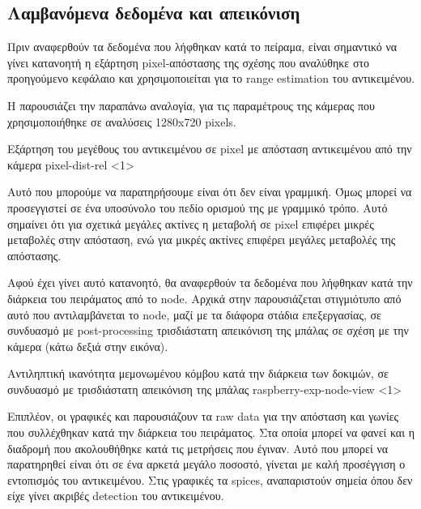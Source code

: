 \subsection{Λαμβανόμενα δεδομένα και απεικόνιση} \label{sec:expe-single-3d}

Πριν αναφερθούν τα δεδομένα που λήφθηκαν κατά το πείραμα, είναι σημαντικό να γίνει κατανοητή η εξάρτηση pixel-απόστασης της σχέσης  που αναλύθηκε στο προηγούμενο κεφάλαιο και χρησιμοποιείται για το range estimation του αντικειμένου.

Η  παρουσιάζει την παραπάνω αναλογία, για τις παραμέτρους της κάμερας που χρησιμοποιήθηκε σε αναλύσεις 1280x720 pixels.

{Εξάρτηση του μεγέθους του αντικειμένου σε pixel με απόσταση αντικειμένου από την κάμερα}%
{pixel-dist-rel}%
<1>

Αυτό που μπορούμε να παρατηρήσουμε είναι ότι δεν είναι γραμμική. Όμως μπορεί να προσεγγιστεί σε ένα υποσύνολο του πεδίο ορισμού της με γραμμικό τρόπο. Αυτό σημαίνει ότι για σχετικά μεγάλες ακτίνες η μεταβολή σε pixel επιφέρει μικρές με\-τα\-βο\-λές στην απόσταση, ενώ για μικρές ακτίνες επιφέρει μεγάλες μεταβολές της απόστασης. 

Αφού έχει γίνει αυτό κατανοητό, θα αναφερθούν τα δεδομένα που λήφθηκαν κατά την διάρκεια του πειράματος από το node.
Αρχικά στην  παρουσιάζεται στιγμιότυπο από αυτό που αντιλαμβάνεται 
το node, μαζί με τα διάφορα στάδια ε\-πε\-ξε\-ργα\-σίας, σε συνδυασμό με post-processing τρισδιάστατη απεικόνιση 
της μπάλας σε σχέση με την κάμερα (κάτω δεξιά στην εικόνα).

{Αντιληπτική ικανότητα μεμονωμένου κόμβου κατά την διάρκεια των δοκιμών, σε συνδυασμό με τρισδιάστατη απεικόνιση της μπάλας}%
{raspberry-exp-node-view}%
<1>

Επιπλέον, οι γραφικές  και  παρουσιάζουν τα raw data για την απόσταση και γωνίες που συλλέχθηκαν κατά την διάρκεια του πειράματος. Στα οποία μπορεί να φανεί και η διαδρομή που ακολουθήθηκε κατά τις μετρήσεις που έγιναν. Αυτό που μπορεί να παρατηρηθεί είναι ότι σε ένα αρκετά μεγάλο ποσοστό, γίνεται με καλή προσέγγιση ο εντοπισμός του αντικειμένου. Στις γραφικές τα spices, αναπαριστούν σημεία όπου δεν είχε γίνει ακριβές detection του αντικειμένου.

